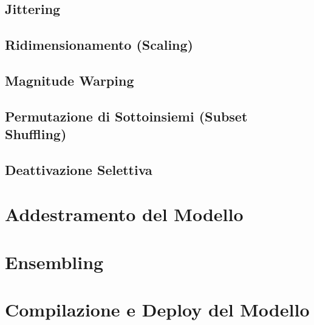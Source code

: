 \subsection{Jittering}
\subsection{Ridimensionamento (Scaling)}
\subsection{Magnitude Warping}
\subsection{Permutazione di Sottoinsiemi (Subset Shuffling)}
\subsection{Deattivazione Selettiva}
\section{Addestramento del Modello}
\section{Ensembling}
\section{Compilazione e Deploy del Modello}


